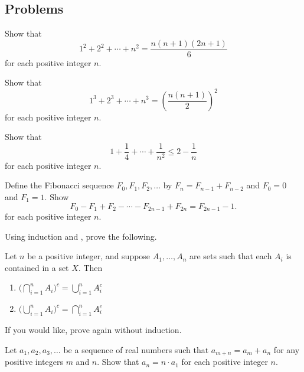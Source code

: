 \documentclass[../main.tex]{subfiles}
\begin{document}
\subsection{Problems}
\begin{homework}
    Show that
    \[1^2+2^2+\cdots +n^2=\frac{n(n+1)(2n+1)}{6}\]
    for each positive integer $n$.
\end{homework}
\begin{homework}
    Show that
    \[1^3+2^3+\cdots+n^3=\left(\frac{n(n+1)}2\right)^2\]
    for each positive integer $n$.
\end{homework}
\begin{homework} \label{hw:basel}
    Show that $$1+\frac{1}{4}+\cdots +\frac{1}{n^2} \le 2-\frac{1}{n}$$ for each positive integer $n$.
\end{homework}
\begin{homework} \label{hw:fib-diff}
    Define the Fibonacci sequence $F_0,F_1,F_2,\ldots$ by $F_n=F_{n-1}+F_{n-2}$ and $F_0=0$ and $F_1=1$. Show
    \[F_0-F_1+F_2-\cdots-F_{2n-1}+F_{2n}=F_{2n-1}-1.\]
    for each positive integer $n$.
\end{homework}
\begin{homework}
    Using induction and , prove the following.
    \begin{theorem} \label{thm:general-de-morgan}
        Let $n$ be a positive integer, and suppose $A_1, \dots, A_n$ are sets such that each $A_i$ is contained in a set $X$. Then
        \begin{enumerate}[label=(\alph*)]
            \item $\Big(\bigcap_{i = 1}^nA_i\Big)^c = \bigcup_{i = 1}^n A_i^c$
            \item $\Big(\bigcup_{i = 1}^nA_i\Big)^c = \bigcap_{i = 1}^n A_i^c$
        \end{enumerate}
    \end{theorem}
    If you would like, prove  again without induction.
\end{homework}
\begin{homework}
    Let $a_1,a_2,a_3,\ldots$ be a sequence of real numbers such that $a_{m+n}=a_m+a_n$ for any positive integers $m$ and $n$. Show that $a_n=n\cdot a_1$ for each positive integer $n$.
\end{homework}
\end{document}
